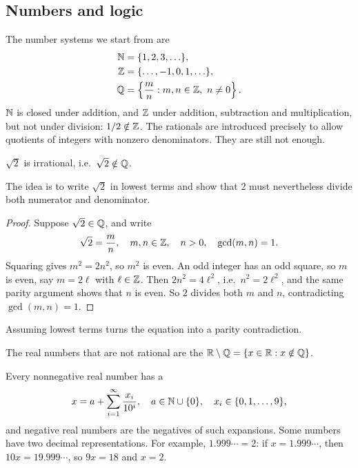 \subsection{Numbers and logic}
The number systems we start from are
\begin{align*}
  \mathbb{N} &= \{1, 2, 3, \ldots\},\\
  \mathbb{Z} &= \{\ldots, -1, 0, 1, \ldots\},\\
  \mathbb{Q} &= \left\{\frac{m}{n} : m, n \in \mathbb{Z},\ n \neq 0\right\}.
\end{align*}
$\mathbb{N}$ is closed under addition, and $\mathbb{Z}$ under addition, subtraction and
multiplication, but not under division: $1/2 \notin \mathbb{Z}$. The rationals are
introduced precisely to allow quotients of integers with nonzero
denominators. They are still not enough.

\begin{nthm}\label{thm:sqrt2-irrational}
  $\sqrt{2}$ is irrational, i.e.\ $\sqrt{2} \notin \mathbb{Q}$.
\end{nthm}
The idea is to write $\sqrt 2$ in lowest terms and show that $2$ must
nevertheless divide both numerator and denominator.

\begin{proof}
  Suppose $\sqrt{2} \in \mathbb{Q}$, and write
  \[
    \sqrt{2} = \frac{m}{n},\quad m, n \in \mathbb{Z},\quad n > 0,\quad \gcd(m, n) = 1.
  \]
  Squaring gives $m^2 = 2n^2$, so $m^2$ is even. An odd integer has an odd
  square, so $m$ is even, say $m = 2\ell$ with $\ell \in \mathbb{Z}$. Then
  $2n^2 = 4\ell^2$, i.e.\ $n^2 = 2\ell^2$, and the same parity argument shows
  that $n$ is even. So $2$ divides both $m$ and $n$, contradicting
  $\gcd(m, n) = 1$.
\end{proof}

\begin{significant}
  Assuming lowest terms turns the equation into a parity contradiction.
\end{significant}

The real numbers that are not rational are the 
$\mathbb{R} \setminus \mathbb{Q} = \{x \in \mathbb{R} : x \notin \mathbb{Q}\}$.

\begin{eg}
  Every nonnegative real number has a 
  \[
    x = a + \sum_{i=1}^{\infty} \frac{x_i}{10^i},\quad a \in \mathbb{N} \cup \{0\},\quad x_i \in \{0, 1, \ldots, 9\},
  \]
  and negative real numbers are the negatives of such expansions. Some
  numbers have two decimal representations. For example, $1.999\cdots = 2$:
  if $x = 1.999\cdots$, then $10x = 19.999\cdots$, so $9x = 18$ and $x = 2$.
\end{eg}

